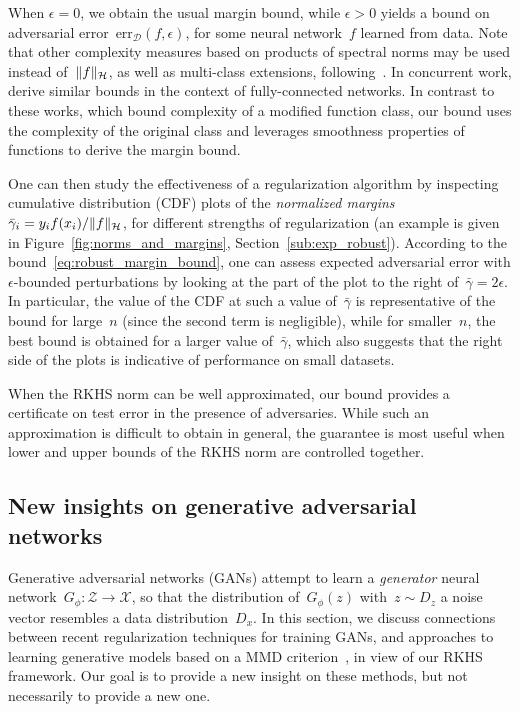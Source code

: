 When $\epsilon = 0$, we obtain the usual margin bound, while $\epsilon > 0$ yields
a bound on adversarial error~$\text{err}_\mathcal D(f, \epsilon)$,
for some neural network~$f$ learned from data.
Note that other complexity measures based on products of spectral norms may be used instead of~$\|f\|_{\mathcal H}$,
as well as multi-class extensions, following~\citet{bartlett2017spectrally,neyshabur2017pac}.
In concurrent work, \citet{khim2018adversarial,yin2019rademacher} derive similar bounds
in the context of fully-connected networks.
In contrast to these works, which bound complexity of a modified function class,
our bound uses the complexity of the original class and leverages smoothness properties
of functions to derive the margin bound.

One can then study the effectiveness of a regularization algorithm by inspecting
cumulative distribution (CDF) plots of the
\emph{normalized margins} $\bar{\gamma}_i = y_i f(x_i) / \|f\|_{\mathcal H}$,
for different strengths of regularization (an example is given in Figure~\ref{fig:norms_and_margins}, Section~\ref{sub:exp_robust}).
According to the bound~\eqref{eq:robust_margin_bound}, one can assess expected adversarial error with $\epsilon$-bounded perturbations
by looking at the part of the plot to the right of~$\bar{\gamma} = 2\epsilon$.
In particular, the value of the CDF at such a value of~$\bar{\gamma}$ is representative of the
bound for large~$n$ (since the second term is negligible),
while for smaller~$n$, the best bound is obtained for a larger value of~$\bar{\gamma}$, which also suggests that
the right side of the plots is indicative of performance on small datasets.

When the RKHS norm can be well approximated, our bound provides a certificate on
test error in the presence of adversaries. 
While such an approximation is difficult to
obtain in general, the guarantee is most useful when lower and upper bounds of the RKHS norm are controlled together.


\subsection{New insights on generative adversarial networks}
\label{sub:gan_reg}

Generative adversarial networks (GANs) attempt to learn a \emph{generator} neural network~$G_\phi : \mathcal Z \to \mathcal X$,
so that the distribution of~$G_\phi(z)$ with~$z \sim D_z$ a noise vector resembles a data distribution~$D_x$.
In this section, we discuss connections between recent regularization techniques for
training GANs, and approaches to learning generative models
based on a MMD criterion~\citep{gretton2012kernel}, in view of our RKHS framework.
Our goal is to provide a new insight on these methods, but not necessarily to provide a new one.

